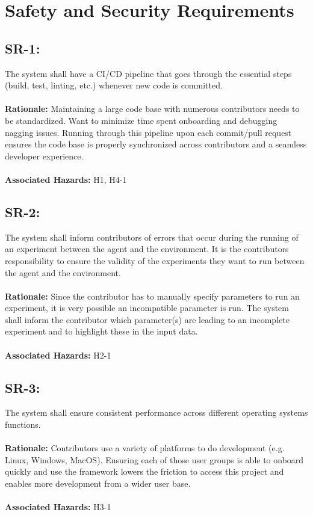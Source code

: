 \documentclass{article}
\begin{document}
\section{Safety and Security Requirements}

\subsection*{SR-1:}
\label{SR-1}
The system shall have a CI/CD pipeline that goes through the essential steps (build, test, linting, etc.) whenever new code is committed. \\ \\
\textbf{Rationale:} Maintaining a large code base with numerous contributors needs to be standardized. Want to minimize time spent onboarding and debugging nagging issues. Running through this pipeline upon each commit/pull request ensures the code base is properly synchronized across contributors and a seamless developer experience. \\ \\
\textbf{Associated Hazards:} H1, H4-1

\subsection*{SR-2:}
\label{SR-2}
The system shall inform contributors of errors that occur during the running of an experiment between the agent and the environment. It is the contributors responsibility to ensure the validity of the experiments they want to run between the agent and the environment. \\ \\ 
\textbf{Rationale:} Since the contributor has to manually specify parameters to run an experiment, it is very possible an incompatible parameter is run. The system shall inform the contributor which parameter(s) are leading to an incomplete experiment and to highlight these in the input data. \\ \\ 
\textbf{Associated Hazards:} H2-1

\subsection*{SR-3:}
\label{SR-3}
The system shall ensure consistent performance across different operating systems functions. \\ \\
\textbf{Rationale:} Contributors use a variety of platforms to do development (e.g. Linux, Windows, MacOS). Ensuring each of those user groups is able to onboard quickly and use the framework lowers the friction to access this project and enables more development from a wider user base. \\ \\
\textbf{Associated Hazards:} H3-1
\end{document}
